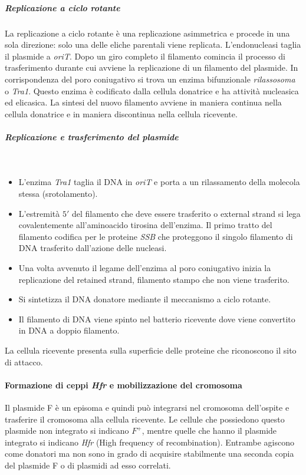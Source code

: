 				\subparagraph{Replicazione a ciclo rotante}
				La replicazione a ciclo rotante \`e una replicazione asimmetrica e procede in una sola direzione: solo una delle eliche parentali viene replicata.
				L'endonucleasi taglia il plasmide a \emph{oriT}.
				Dopo un giro completo il filamento comincia il processo di trasferimento durante cui avviene la replicazione di un filamento del plasmide.
				In corrispondenza del poro coniugativo si trova un enzima bifunzionale \emph{rilassosoma} o \emph{Tra1}.
				Questo enzima \`e codificato dalla cellula donatrice e ha attivit\`a nucleasica ed elicasica.
				La sintesi del nuovo filamento avviene in maniera continua nella cellula donatrice e in maniera discontinua nella cellula ricevente.

				\subparagraph{Replicazione e trasferimento del plasmide}\mbox{}\\
				\begin{multicols}{2}
					\begin{itemize}
    						\item L'enzima \emph{Tra1} taglia il DNA in \emph{oriT} e porta a un rilassamento della molecola stessa (srotolamento). 
						\item L'estremità $5'$ del filamento che deve essere trasferito o external strand si lega covalentemente all'aminoacido tirosina dell'enzima. 
							Il primo tratto del filamento codifica per le proteine \emph{SSB} che proteggono il singolo filamento di DNA trasferito dall'azione delle nucleasi. 
    						\item Una volta avvenuto il legame dell'enzima al poro coniugativo inizia la replicazione del retained strand, filamento stampo che non viene trasferito.
						\item Si sintetizza il DNA donatore mediante il meccanismo a ciclo rotante.
						\item Il filamento di DNA viene spinto nel batterio ricevente dove viene convertito in DNA a doppio filamento.
					\end{itemize}
				\end{multicols}
				La cellula ricevente presenta sulla superficie delle proteine che riconoscono il sito di attacco. 

			\paragraph{Formazione di ceppi \emph{Hfr} e mobilizzazione del cromosoma}
			Il plasmide F è un episoma e quindi può integrarsi nel cromosoma dell'ospite e trasferire il cromosoma alla cellula ricevente. 
			Le cellule che possiedono questo plasmide non integrato si indicano \emph{$F^{+}$}, mentre quelle che hanno il plasmide integrato si indicano \emph{Hfr} (High frequency of recombination). 
			Entrambe agiscono come donatori ma non sono in grado di acquisire stabilmente una seconda copia del plasmide F o di plasmidi ad esso correlati.

